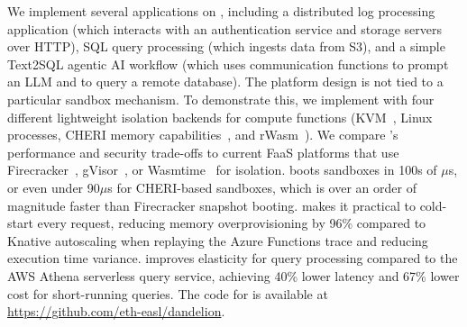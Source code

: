 We implement several applications on \dandelion, including a distributed log processing application (which interacts with an authentication service and storage servers over HTTP), SQL query processing (which ingests data from S3), and a simple Text2SQL agentic AI workflow (which uses communication functions to prompt an LLM and to query a remote database).
The platform design is not tied to a particular sandbox mechanism. To demonstrate this, we implement \dandelion with four different lightweight isolation backends for compute functions (KVM~\cite{kvm}, Linux processes, CHERI memory capabilities~\cite{cheri}, and rWasm~\cite{rwasm}).
We compare \dandelion's performance and security trade-offs to current FaaS platforms that use Firecracker~\cite{firecracker}, gVisor~\cite{gvisor}, or Wasmtime~\cite{wasmtime} for isolation. \dandelion boots sandboxes in 100s of $\mu$s, or even under 90$\mu$s for CHERI-based sandboxes, which is over an order of magnitude faster than Firecracker snapshot booting. \dandelion makes it practical to cold-start every request, reducing memory overprovisioning by 96\% compared to Knative autoscaling when replaying the Azure Functions trace and reducing execution time variance.
\dandelion improves elasticity for query processing compared to the AWS Athena serverless query service, achieving 40\% lower latency and 67\% lower cost for short-running queries.
The code for \dandelion is available at \url{https://github.com/eth-easl/dandelion}.